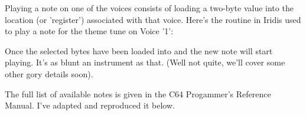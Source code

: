Playing a note on one of the voices consists of loading a two-byte value into the location
(or 'register') associated with that voice. Here's the routine in Iridis used to play a note
for the theme tune on Voice '1':

%


Once the selected bytes have been loaded into  and  the new note will start playing. 
It's as blunt an instrument as that. (Well not quite, we'll cover some other gory details soon). 

The full list of available notes is given in the C64 Progammer's Reference Manual. I've adapted and reproduced it below.

